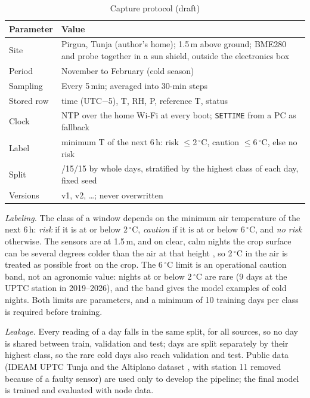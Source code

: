 \documentclass[conference]{IEEEtran}
\begin{document}
\begin{table}[t]
\caption{Capture protocol (draft)}
\label{tab:protocol}
\centering
\begin{tabular}{@{}>{\raggedright}p{2.2cm}>{\raggedright\arraybackslash}p{5.6cm}@{}}
\toprule
Parameter & Value \\
\midrule
Site & Pirgua, Tunja (author's home); 1.5\,m above ground; BME280 and probe together in a sun shield, outside the electronics box \\
Period & November to February (cold season) \\
Sampling & Every 5\,min; averaged into 30-min steps \\
Stored row & time (UTC$-$5), T, RH, P, reference T, status \\
Clock & NTP over the home Wi-Fi at every boot; \texttt{SETTIME} from a PC as fallback \\
Label & minimum T of the next 6\,h: risk $\le$2\,$^\circ$C, caution $\le$6\,$^\circ$C, else no risk \\
Split & 70/15/15 by whole days, stratified by the highest class of each day, fixed seed \\
Versions & v1, v2, \dots; never overwritten \\
\bottomrule
\end{tabular}
\end{table}

\textit{Labeling.} The class of a window depends on the minimum air temperature of the next 6\,h: \emph{risk} if it is at or below 2\,$^\circ$C, \emph{caution} if it is at or below 6\,$^\circ$C, and \emph{no risk} otherwise. The sensors are at 1.5\,m, and on clear, calm nights the crop surface can be several degrees colder than the air at that height \cite{fao_frost}, so 2\,$^\circ$C in the air is treated as possible frost on the crop. The 6\,$^\circ$C limit is an operational caution band, not an agronomic value: nights at or below 2\,$^\circ$C are rare (9 days at the UPTC station in 2019--2026), and the band gives the model examples of cold nights. Both limits are parameters, and a minimum of 10 training days per class is required before training.

\textit{Leakage.} Every reading of a day falls in the same split, for all sources, so no day is shared between train, validation and test; days are split separately by their highest class, so the rare cold days also reach validation and test. Public data (IDEAM UPTC Tunja \cite{ideam_data} and the Altiplano dataset \cite{zenodo2026}, with station 11 removed because of a faulty sensor) are used only to develop the pipeline; the final model is trained and evaluated with node data.
\end{document}
